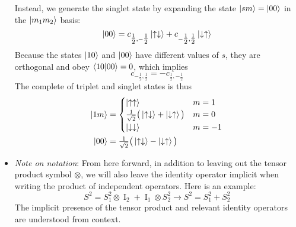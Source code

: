 \documentclass[11pt, a4paper]{article}
\newcommand{\ua}{\uparrow}  %
\newcommand{\da}{\downarrow}  %
\newcommand{\II}{\operatorname{I}}  %
\begin{document}
\begin{itemize}
    Instead, we generate the singlet state by expanding the state $ \ket{sm} = \ket{00} $ in the $ \ket{m_{1}m_{2}} $ basis:
    \begin{equation*}
        \ket{00} = c_{\tfrac{1}{2},-\tfrac{1}{2}} \ket{\ua\da} + c_{-\tfrac{1}{2}, \tfrac{1}{2}}\ket{\da \ua}
    \end{equation*}
    Because the states $ \ket{10} $ and $ \ket{00} $ have different values of $ s $, they are orthogonal and obey $ \braket{10}{00} = 0 $, which implies
    \begin{equation*}
        c_{-\tfrac{1}{2}, \tfrac{1}{2}} = - c_{\tfrac{1}{2}, -\tfrac{1}{2}}
    \end{equation*}
    The complete of triplet and singlet states is thus
    \begin{align*}
        \ket{1m} &= 
        \begin{cases}
            \ket{\ua\ua} & m = 1\\
            \tfrac{1}{\sqrt{2}} \big( \ket{\ua\da} + \ket{\da\ua} \big) & m = 0\\
            \ket{\da\da} & m = -1
        \end{cases}\\
        \ket{00} &= \tfrac{1}{\sqrt{2}} \big( \ket{\ua\da} - \ket{\da \ua} \big)
    \end{align*}
   

    \item \textit{Note on notation}: From here forward, in addition to leaving out the tensor product symbol $ \otimes $, we will also leave the identity operator implicit when writing the product of independent operators. Here is an example:
    \begin{equation*}
        S^{2} = S_{1}^{2}\otimes\II_{2} + \II_{1} \otimes S_{2}^{2} \to S^{2} = S_{1}^{2} + S_{2}^{2}
    \end{equation*}
    The implicit presence of the tensor product and relevant identity operators are understood from context.
	
\end{itemize}
\end{document}
